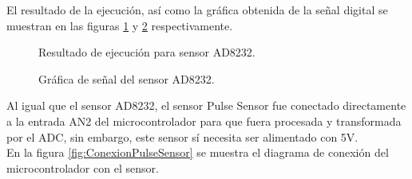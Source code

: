 El resultado de la ejecución, así como la gráfica obtenida de la señal digital se muestran en las figuras \ref{fig:TerminalAD8232} y \ref{fig:GraficaAD8232} respectivamente.\\

	\begin{figure}[htbp!]
		\centering
		\caption{Resultado de ejecución para sensor AD8232.}
		\label{fig:TerminalAD8232}
	\end{figure}
	
	\begin{figure}[htbp!]
		\centering
		\caption{Gráfica de señal del sensor AD8232.}
		\label{fig:GraficaAD8232}
	\end{figure}
	
Al igual que el sensor AD8232, el sensor Pulse Sensor fue conectado directamente a la entrada AN2 del microcontrolador para que fuera procesada y transformada por el ADC, sin embargo, este sensor sí necesita ser alimentado con 5V.\\

En la figura \ref{fig:ConexionPulseSensor} se muestra el diagrama de conexión del microcontrolador con el sensor.\\
	
